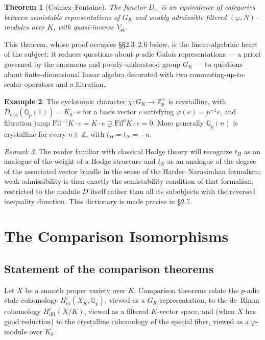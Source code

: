 \documentclass[10pt]{amsbook}
\newtheorem{theorem}{Theorem}[chapter]
\theoremstyle{definition}
\newtheorem{example}[theorem]{Example}
\theoremstyle{remark}
\newtheorem{remark}[theorem]{Remark}
\newcommand{\Zp}{\mathbb{Z}_p}
\newcommand{\Qp}{\mathbb{Q}_p}
\begin{document}
\begin{theorem}[Colmez--Fontaine]\label{thm:cf-equivalence}
The functor $D_{\mathrm{st}}$ is an equivalence of categories between semistable
representations of $G_K$ and weakly admissible filtered $(\varphi, N)$-modules over $K$, with
quasi-inverse $V_{\mathrm{st}}$.
\end{theorem}

This theorem, whose proof occupies \S\S 2.3--2.6 below, is the linear-algebraic heart of the
subject: it reduces questions about $p$-adic Galois representations — a priori governed by
the enormous and poorly-understood group $G_K$ — to questions about finite-dimensional linear
algebra decorated with two commuting-up-to-scalar operators and a filtration.

\begin{example}\label{ex:tate-twist}
The cyclotomic character $\chi \colon G_K \to \Zp^{\times}$ is crystalline, with
$D_{\mathrm{cris}}(\Qp(1)) = K_0 \cdot e$ for a basis vector $e$ satisfying $\varphi(e) =
p^{-1} e$, and filtration jump $\mathrm{Fil}^{-1} K \cdot e = K \cdot e \supsetneq
\mathrm{Fil}^0 K \cdot e = 0$. More generally $\Qp(n)$ is crystalline for every $n \in
\mathbb{Z}$, with $t_H = t_N = -n$.
\end{example}

\begin{remark}
The reader familiar with classical Hodge theory will recognize $t_H$ as an analogue of the
weight of a Hodge structure and $t_N$ as an analogue of the degree of the associated vector
bundle in the sense of the Harder--Narasimhan formalism; weak admissibility is then exactly
the semistability condition of that formalism, restricted to the module $D$ itself rather than
all its subobjects with the reversed inequality direction. This dictionary is made precise in
\S 2.7.
\end{remark}

\chapter{The Comparison Isomorphisms}
\label{ch:comparison}

\section{Statement of the comparison theorems}

Let $X$ be a smooth proper variety over $K$. Comparison theorems relate the $p$-adic étale
cohomology $H^i_{\mathrm{\acute et}}(X_{\overline K}, \Qp)$, viewed as a $G_K$-representation,
to the de~Rham cohomology $H^i_{\mathrm{dR}}(X/K)$, viewed as a filtered $K$-vector space, and
(when $X$ has good reduction) to the crystalline cohomology of the special fiber, viewed as a
$\varphi$-module over $K_0$.
\end{document}
